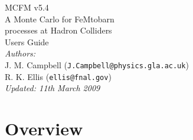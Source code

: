 \documentclass[12pt]{article}
\begin{document}
\def\GeV{\mbox{GeV}}
\def\cteqsixsixm{\mbox{0802.0007 [hep-ph]}}
\def\cteqsixonem{\mbox{hep-ph/0303013}}
\def\cteqsix{\mbox{hep-ph/0201195}}
\def\cteqfive{\mbox{hep-ph/9903282}}
\def\cteqfour{\mbox{hep-ph/9606399}}
\def\cteqthree{\mbox{MSU-HEP/41024}}
\def\mrstff{\mbox{hep-ph/0603143}}
\def\mrstohtwo{\mbox{hep-ph/0211080}}
\def\mrstohone{\mbox{hep-ph/0110215}}
\def\mrsninenine{\mbox{hep-ph/9907231}}
\def\mrsnineeight{\mbox{hep-ph/9803445}}
\def\mrsninesix{\mbox{PLB387 (1996) 419}}
\def\mrsninefive{\mbox{PLB354 (1995) 155}}
\def\hmrs{\mbox{Durham DTP-90-04}}
\def\mstwoheight{\mbox{0901.0002 [hep-ph]}}

\thispagestyle{empty}
\vspace*{3cm}
\begin{center}
{\Huge MCFM v5.4} \\
\vspace*{0.5cm}
\Large{A Monte Carlo for FeMtobarn} \\
\Large{processes at Hadron Colliders} \\
\vspace*{2cm}
{\huge Users Guide} \\
\vspace*{4cm}
{\it Authors:} \\
\vspace*{0.2cm}
J. M. Campbell ({\tt J.Campbell@physics.gla.ac.uk}) \\
R. K. Ellis ({\tt ellis@fnal.gov}) \\
\vspace*{2.5cm}
{\it \small Updated: 11th March 2009}
\end{center}

\newpage

\tableofcontents

\section{Overview}
\end{document}
